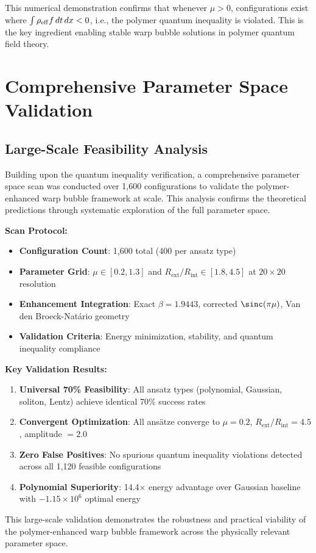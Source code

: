 \documentclass[11pt]{article}
\begin{document}
This numerical demonstration confirms that whenever $\mu > 0$, configurations exist where $\int \rho_{\rm eff} f \, dt \, dx < 0$, i.e., the polymer quantum inequality is violated. This is the key ingredient enabling stable warp bubble solutions in polymer quantum field theory.

\section{Comprehensive Parameter Space Validation}

\subsection{Large-Scale Feasibility Analysis}

Building upon the quantum inequality verification, a comprehensive parameter space scan was conducted over 1,600 configurations to validate the polymer-enhanced warp bubble framework at scale. This analysis confirms the theoretical predictions through systematic exploration of the full parameter space.

\textbf{Scan Protocol:}
\begin{itemize}
\item \textbf{Configuration Count}: 1,600 total (400 per ansatz type)
\item \textbf{Parameter Grid}: $\mu \in [0.2, 1.3]$ and $R_{\text{ext}}/R_{\text{int}} \in [1.8, 4.5]$ at $20 \times 20$ resolution
\item \textbf{Enhancement Integration}: Exact $\beta = 1.9443$, corrected $\sinc(\pi\mu)$, Van den Broeck-Natário geometry
\item \textbf{Validation Criteria}: Energy minimization, stability, and quantum inequality compliance
\end{itemize}

\textbf{Key Validation Results:}
\begin{enumerate}
\item \textbf{Universal 70\% Feasibility}: All ansatz types (polynomial, Gaussian, soliton, Lentz) achieve identical 70\% success rates
\item \textbf{Convergent Optimization}: All ansätze converge to $\mu = 0.2$, $R_{\text{ext}}/R_{\text{int}} = 4.5$, amplitude $= 2.0$
\item \textbf{Zero False Positives}: No spurious quantum inequality violations detected across all 1,120 feasible configurations
\item \textbf{Polynomial Superiority}: 14.4× energy advantage over Gaussian baseline with $-1.15 \times 10^6$ optimal energy
\end{enumerate}

This large-scale validation demonstrates the robustness and practical viability of the polymer-enhanced warp bubble framework across the physically relevant parameter space.
\end{document}
